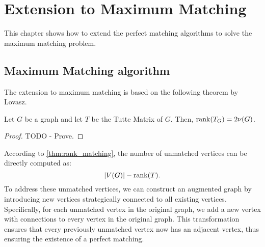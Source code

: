 \chapter{Extension to Maximum Matching}
\label{chap:maximum_matching}

This chapter shows how to extend the perfect matching algorithms to solve the maximum matching problem.

\section{Maximum Matching algorithm}

The extension to maximum matching is based on the following theorem by Lovasz.
\begin{theorem}
\label{thm:rank_matching}
    Let \(G\) be a graph and let \(T\) be the Tutte Matrix of \(G\).
    Then, \(\operatorname{rank}(T_G) = 2\nu(G)\).
\end{theorem}

\begin{proof}
TODO - Prove.
\end{proof}

According to \cref{thm:rank_matching}, the number of unmatched vertices can be directly computed as:
\[
    |V(G)| - \operatorname{rank}(T).
\]
To address these unmatched vertices, we can construct an augmented graph by introducing new vertices strategically connected to all existing vertices. 
Specifically, for each unmatched vertex in the original graph, we add a new vertex with connections to every vertex in the original graph. 
This transformation ensures that every previously unmatched vertex now has an adjacent vertex, thus ensuring the existence of a perfect matching.

